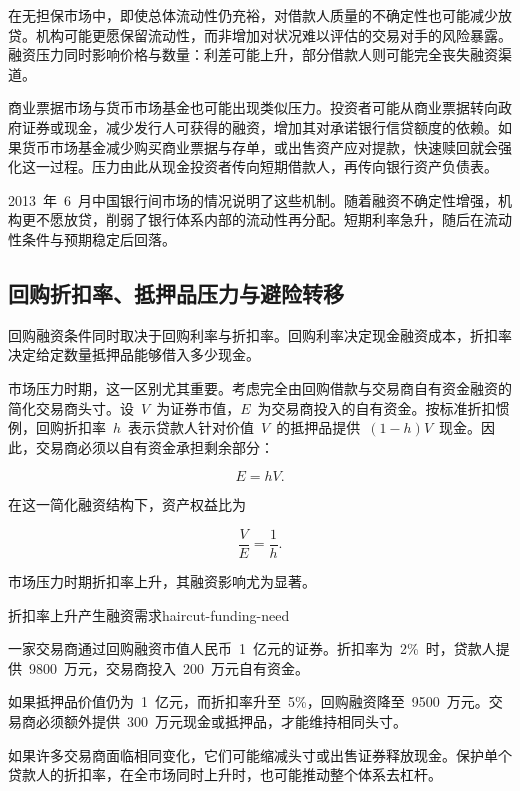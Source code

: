 在无担保市场中，即使总体流动性仍充裕，对借款人质量的不确定性也可能减少放贷。机构可能更愿保留流动性，而非增加对状况难以评估的交易对手的风险暴露。融资压力同时影响价格与数量：利差可能上升，部分借款人则可能完全丧失融资渠道。

商业票据市场与货币市场基金也可能出现类似压力。投资者可能从商业票据转向政府证券或现金，减少发行人可获得的融资，增加其对承诺银行信贷额度的依赖。如果货币市场基金减少购买商业票据与存单，或出售资产应对提款，快速赎回就会强化这一过程。压力由此从现金投资者传向短期借款人，再传向银行资产负债表。

2013~年~6~月中国银行间市场的情况说明了这些机制。随着融资不确定性增强，机构更不愿放贷，削弱了银行体系内部的流动性再分配。短期利率急升，随后在流动性条件与预期稳定后回落。

\subsection{回购折扣率、抵押品压力与避险转移}

回购融资条件同时取决于回购利率与折扣率。回购利率决定现金融资成本，折扣率决定给定数量抵押品能够借入多少现金。

市场压力时期，这一区别尤其重要。考虑完全由回购借款与交易商自有资金融资的简化交易商头寸。设~$V$~为证券市值，$E$~为交易商投入的自有资金。按标准折扣惯例，回购折扣率~$h$~表示贷款人针对价值~$V$~的抵押品提供~$(1-h)V$~现金。因此，交易商必须以自有资金承担剩余部分：

\begin{equation*}
E=hV.
\label{eq:ch7-haircut-equity}
\end{equation*}

在这一简化融资结构下，资产权益比为

\begin{equation*}
\frac{V}{E}=\frac{1}{h}.
\label{eq:ch7-haircut-leverage}
\end{equation*}

市场压力时期折扣率上升，其融资影响尤为显著。

\begin{example}{折扣率上升产生融资需求}{haircut-funding-need}

一家交易商通过回购融资市值人民币~1~亿元的证券。折扣率为~2\%~时，贷款人提供~9800~万元，交易商投入~200~万元自有资金。

如果抵押品价值仍为~1~亿元，而折扣率升至~5\%，回购融资降至~9500~万元。交易商必须额外提供~300~万元现金或抵押品，才能维持相同头寸。

如果许多交易商面临相同变化，它们可能缩减头寸或出售证券释放现金。保护单个贷款人的折扣率，在全市场同时上升时，也可能推动整个体系去杠杆。

\end{example}


